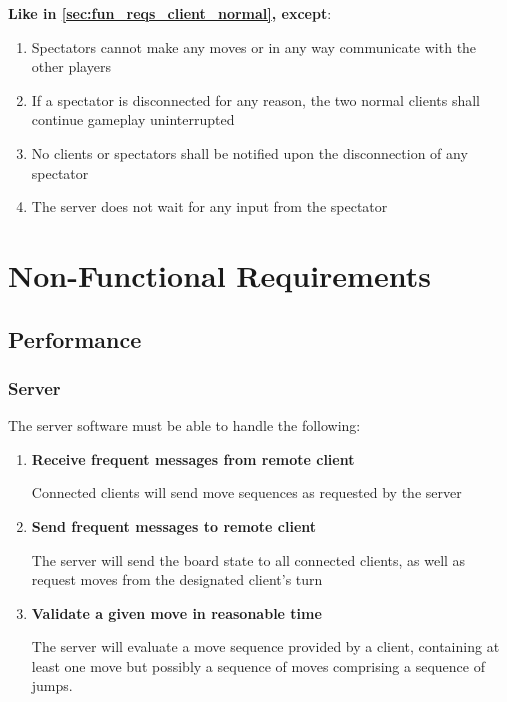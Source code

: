 \documentclass[letterpaper]{article}
\begin{document}
\textbf{Like in \cref{sec:fun_reqs_client_normal}, except}:

\begin{enumerate}
    \item Spectators cannot make any moves or in any way
          communicate with the other players
    \item If a spectator is disconnected for any reason, the two
          normal clients shall continue gameplay uninterrupted
    \item No clients or spectators shall be notified upon the
          disconnection of any spectator
    \item The server does not wait for any input from the
          spectator
\end{enumerate}


\section{Non-Functional Requirements}
\label{sec:nofun_reqs}

\subsection{Performance}
\label{sec:nofun_reqs_performance}

\subsubsection{Server}

The server software must be able to handle the following:

\begin{enumerate}
    \item \textbf{Receive frequent messages from remote client}
          
          Connected clients will send move sequences as
          requested by the server
          
    \item \textbf{Send frequent messages to remote client}
          
          The server will send the board state to all
          connected clients, as well as request moves from
          the designated client's turn
          
    \item \textbf{Validate a given move in reasonable time}
          
          The server will evaluate a move sequence provided
          by a client, containing at least one move but
          possibly a sequence of moves comprising a sequence
          of jumps.
          
\end{enumerate}
\end{document}
